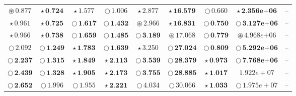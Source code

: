 \documentclass[
]{article}
\begin{document}
\begin{table}[!h]
\begin{tabular}[t]{ccccccccc}
\cellcolor[HTML]{DF536B}$\circledast\,\textit{0.877}$ & \cellcolor[HTML]{2297E6}$\star\,\textbf{0.724}$ & \cellcolor[HTML]{DF536B}$\star\,\textit{1.577}$ & \cellcolor[HTML]{FFFFFF}$\bigcirc\,1.006$ & \cellcolor[HTML]{2297E6}$\star\,\textit{2.877}$ & \cellcolor[HTML]{DF536B}$\star\,\textbf{16.579}$ & \cellcolor[HTML]{FFFFFF}$\bigcirc\,0.660$ & \cellcolor[HTML]{F5C710}$\star\,\textbf{2.356e+06}$ & --\\
\cellcolor[HTML]{2297E6}$\star\,\textit{0.961}$ & \cellcolor[HTML]{DF536B}$\star\,\textbf{0.725}$ & \cellcolor[HTML]{2297E6}$\bigcirc\,\textbf{1.617}$ & \cellcolor[HTML]{2297E6}$\bigcirc\,\textbf{1.432}$ & \cellcolor[HTML]{F5C710}$\circledast\,\textit{2.966}$ & \cellcolor[HTML]{F5C710}$\star\,\textbf{16.831}$ & \cellcolor[HTML]{2297E6}$\bigcirc\,\textbf{0.750}$ & \cellcolor[HTML]{F5C710}$\bigcirc\,\textbf{3.127e+06}$ & --\\
\cellcolor[HTML]{DF536B}$\star\,\textit{0.966}$ & \cellcolor[HTML]{F5C710}$\star\,\textbf{0.738}$ & \cellcolor[HTML]{F5C710}$\bigcirc\,\textbf{1.659}$ & \cellcolor[HTML]{F5C710}$\bigcirc\,\textbf{1.485}$ & \cellcolor[HTML]{DF536B}$\bigcirc\,\textbf{3.189}$ & \cellcolor[HTML]{F5C710}$\circledast\,\textit{17.068}$ & \cellcolor[HTML]{DF536B}$\bigcirc\,\textbf{0.779}$ & \cellcolor[HTML]{F5C710}$\circledast\,\textit{4.968e+06}$ & --\\
\cellcolor[HTML]{FFFFFF}$\bigcirc\,2.092$ & \cellcolor[HTML]{2297E6}$\bigcirc\,\textbf{1.249}$ & \cellcolor[HTML]{F5C710}$\star\,\textbf{1.783}$ & \cellcolor[HTML]{DF536B}$\bigcirc\,\textbf{1.639}$ & \cellcolor[HTML]{DF536B}$\star\,\textit{3.250}$ & \cellcolor[HTML]{DF536B}$\bigcirc\,\textbf{27.024}$ & \cellcolor[HTML]{F5C710}$\bigcirc\,\textbf{0.809}$ & \cellcolor[HTML]{DF536B}$\bigcirc\,\textbf{5.292e+06}$ & --\\
\cellcolor[HTML]{2297E6}$\bigcirc\,\textbf{2.237}$ & \cellcolor[HTML]{DF536B}$\bigcirc\,\textbf{1.315}$ & \cellcolor[HTML]{DF536B}$\star\,\textbf{1.849}$ & \cellcolor[HTML]{F5C710}$\star\,\textbf{2.113}$ & \cellcolor[HTML]{2297E6}$\bigcirc\,\textbf{3.539}$ & \cellcolor[HTML]{2297E6}$\bigcirc\,\textbf{28.379}$ & \cellcolor[HTML]{F5C710}$\star\,\textbf{0.973}$ & \cellcolor[HTML]{2297E6}$\bigcirc\,\textbf{7.768e+06}$ & --\\
\cellcolor[HTML]{DF536B}$\bigcirc\,\textbf{2.439}$ & \cellcolor[HTML]{F5C710}$\bigcirc\,\textbf{1.328}$ & \cellcolor[HTML]{2297E6}$\star\,\textbf{1.905}$ & \cellcolor[HTML]{2297E6}$\star\,\textbf{2.173}$ & \cellcolor[HTML]{F5C710}$\bigcirc\,\textbf{3.755}$ & \cellcolor[HTML]{F5C710}$\bigcirc\,\textbf{28.885}$ & \cellcolor[HTML]{2297E6}$\star\,\textbf{1.017}$ & \cellcolor[HTML]{FFFFFF}$1.922e+07$ & --\\
\cellcolor[HTML]{F5C710}$\bigcirc\,\textbf{2.652}$ & \cellcolor[HTML]{FFFFFF}$\bigcirc\,1.996$ & \cellcolor[HTML]{FFFFFF}$\bigcirc\,1.955$ & \cellcolor[HTML]{DF536B}$\star\,\textbf{2.221}$ & \cellcolor[HTML]{FFFFFF}$\bigcirc\,4.034$ & \cellcolor[HTML]{FFFFFF}$\bigcirc\,30.066$ & \cellcolor[HTML]{DF536B}$\star\,\textbf{1.033}$ & \cellcolor[HTML]{FFFFFF}$\bigcirc\,1.975e+07$ & --\\
\bottomrule
\end{tabular}
\end{table}
\end{document}
